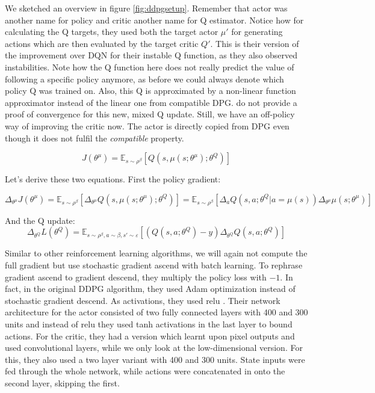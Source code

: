 \documentclass[hyperref,beleg]{cgvpub}
\begin{document}
We sketched an overview in figure \ref{fig:ddpgsetup}. Remember that actor was another name for policy and critic another name for Q estimator. Notice how for calculating the Q targets, they used both the target actor $\mu'$ for generating actions which are then evaluated by the target critic $Q'$. This is their version of the improvement over \ac{DQN} for their instable Q function, as they also observed instabilities. Note how the Q function here does not really predict the value of following a specific policy anymore, as before we could always denote which policy Q was trained on. Also, this Q is approximated by a non-linear function approximator instead of the linear one from compatible \ac{DPG}. \cite{lillicrapCONTINUOUSCONTROLDEEP2015} do not provide a proof of convergence for this new, mixed Q update. Still, we have an off-policy way of improving the critic now. The actor is directly copied from \ac{DPG} even though it does not fulfil the \textit{compatible} property.

\begin{equation}
J(\theta^{\mu}) = \mathbb{E}_{s \sim \rho^{\beta}}[Q(s, \mu(s;\theta^{\mu});\theta^Q)]
\end{equation}

Let's derive these two equations. First the policy gradient:

\begin{equation}
\Delta_{\theta^{\mu}}J(\theta^{\mu}) = \mathbb{E}_{s \sim \rho^{\beta}}[\Delta_{\theta^{\mu}}Q(s, \mu(s;\theta^{\mu});\theta^Q)] = \mathbb{E}_{s \sim \rho^{\beta}}[\Delta_a Q(s, a;\theta^Q | a=\mu(s)) \Delta_{\theta^{\mu}}\mu(s;\theta^{\mu})]
\end{equation}

And the Q update:
\begin{equation}
\Delta_{\theta^Q} L(\theta^Q) = \mathbb{E}_{s \sim \rho^{\beta}, a \sim \beta, s' \sim \varepsilon}[(Q(s, a;\theta^Q) - y)\Delta_{\theta^Q}Q(s, a;\theta^Q)]
\end{equation}

Similar to other reinforcement learning algorithms, we will again not compute the full gradient but use stochastic gradient ascend with batch learning. To rephrase gradient ascend to gradient descend, they multiply the policy loss with $-1$. In fact, in the original \ac{DDPG} algorithm, they used Adam \cite{kingmaAdamMethodStochastic2017} optimization instead of stochastic gradient descend. As activations, they used relu \cite{agarapDeepLearningUsing2019}. Their network architecture for the actor consisted of two fully connected layers with 400 and 300 units and instead of relu they used tanh activations in the last layer to bound actions. For the critic, they had a version which learnt upon pixel outputs and used convolutional layers, while we only look at the low-dimensional version. For this, they also used a two layer variant with 400 and 300 units. State inputs were fed through the whole network, while actions were concatenated in onto the second layer, skipping the first.
\end{document}
